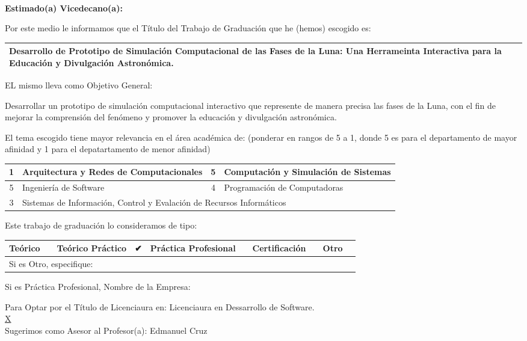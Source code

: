 \\
\textbf{Estimado(a) Vicedecano(a):}

Por este medio le informamos que el Título del Trabajo de Graduación que he (hemos) escogido es:

\begin{tabularx}{\textwidth}{|X|}
  \hline
  Desarrollo de Prototipo de Simulación Computacional de las Fases de la Luna: Una Herrameinta Interactiva para  la Educación y Divulgación Astronómica. \\
  \hline
\end{tabularx}

EL mismo lleva como Objetivo General:

Desarrollar un prototipo de simulación computacional interactivo que represente de manera precisa las fases de la Luna, con el fin de mejorar la comprensión del fenómeno y promover la educación y divulgación astronómica.

El tema escogido tiene mayor relevancia en el área académica de: (ponderar en rangos de 5 a 1, donde 5 es para el departamento de mayor afinidad y 1 para el depatartamento de menor afinidad)

\begin{tabular}{|c|p{20em}|c|p{18em}|}
  \hline
  1 & Arquitectura y Redes de Computacionales & 5 & Computación y Simulación de Sistemas \\
  \hline
  5 & Ingeniería de Software & 4 & Programación de Computadoras \\
  \hline
  3 & \multicolumn{3}{l|}{\raggedright Sistemas de Información, Control y Evalación de Recursos Informáticos} \\
  \hline
\end{tabular}

Este trabajo de graduación lo consideramos de tipo:

\begin{tabular}{|p{7em}|c|p{5em}|c|p{5em}|c|p{8em}|c|p{6em}|c|}
  \hline
  Teórico & & Teórico Práctico & ✔ & Práctica Profesional & & Certificación & & Otro & \\
  \hline
  \multicolumn{3}{|l|}{Si es Otro, especifique:} & \multicolumn{7}{c|}{} \\
  \hline
\end{tabular}

Si es Práctica Profesional, Nombre de la Empresa:

\hspace*{2em} Para Optar por el Título de Licenciaura en: \small{Licenciaura en Dessarrollo de Software.}\normalsize\\
\hspace*{2em} \underline{X}\\
Sugerimos como Asesor al Profesor(a): Edmanuel Cruz

